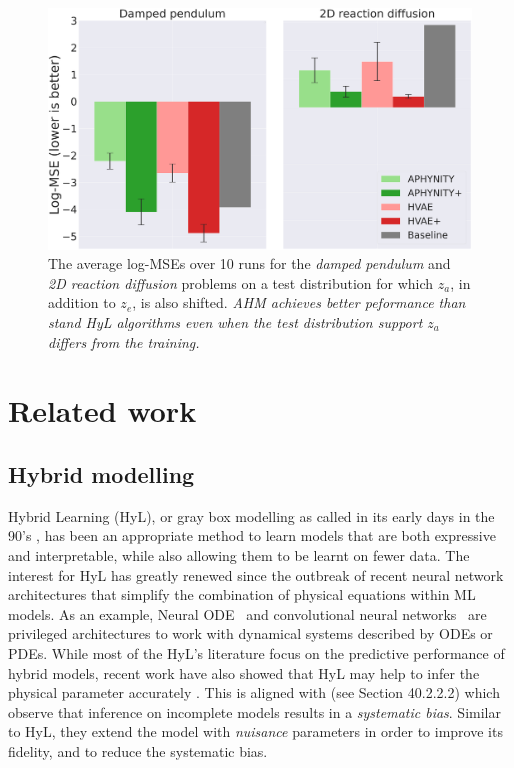 \begin{figure}
    \centering
    \includegraphics[width=.48\textwidth]{figures/chapter07/results_log_mse_za_OOD-4.png}
    \vspace{-2em}
    \caption{The average log-MSEs over 10 runs for the \textit{damped pendulum} and \textit{2D reaction diffusion} problems on a test distribution for which $z_a$, in addition to $z_e$, is also shifted. \textit{AHM achieves better peformance than stand HyL algorithms even when the test distribution support $z_a$ differs from the training.}}
    \label{fig:za_shifted}
    \vspace{-1.em}
\end{figure}

\section{Related work}
\subsection{Hybrid modelling}
Hybrid Learning (HyL), or gray box modelling as called in its early days in the 90's \citep{old_hl_1, old_hl_2, old_hl_3, old_hl_4, old_hl_5}, has been an appropriate method to learn models that are both expressive and interpretable, while also allowing them to be learnt on fewer data. The interest for HyL \citep{hl_1, hl_2, hl_3, hl_4, hl_5, hl_6, metnet2} has greatly renewed since the outbreak of recent neural network architectures that simplify the combination of physical equations within ML models. As an example, Neural ODE~\citep{NODE} and convolutional neural networks~\citep[][CNN]{lecun_cnn} are privileged architectures to work with dynamical systems described by ODEs or PDEs. While most of the HyL's literature focus on the predictive performance of hybrid models, recent work have also showed that HyL may help to infer the physical parameter accurately \citep{APHYNITY, HVAE}. This is aligned with \citet{nuisance_para} (see Section 40.2.2.2) which observe that inference on incomplete models results in a \textit{systematic bias}. Similar to HyL, they extend the model with \textit{nuisance} parameters in order to improve its fidelity, and to reduce the systematic bias.

